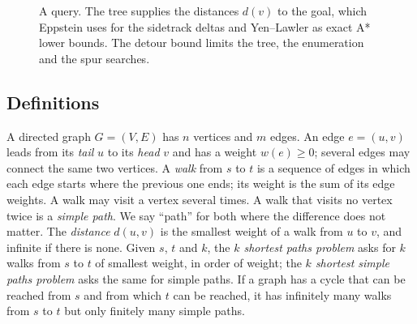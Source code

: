 \documentclass[11pt,a4paper]{article}
\begin{document}
\begin{figure}[t]
\centering
{}
\caption{A query. The tree supplies the distances $d(v)$ to the goal, which Eppstein uses for the sidetrack deltas and
Yen--Lawler as exact A* lower bounds. The detour bound limits the tree, the enumeration and the spur searches.}
\label{fig:pipeline}
\end{figure}

\subsection{Definitions}\label{sec:definitions}
A directed graph $G=(V,E)$ has $n$ vertices and $m$ edges. An edge $e=(u,v)$ leads from its \emph{tail} $u$ to its
\emph{head} $v$ and has a weight $w(e)\ge 0$; several edges may connect the same two vertices. A \emph{walk} from $s$
to $t$ is a sequence of edges in which each edge starts where the previous one ends; its weight is the sum of its
edge weights. A walk may visit a vertex several times. A walk that visits no vertex twice is a \emph{simple path}.
We say ``path'' for both where the difference does not matter. The \emph{distance} $d(u,v)$ is the smallest weight of
a walk from $u$ to $v$, and infinite if there is none. Given $s$, $t$ and $k$, the \emph{$k$ shortest paths problem}
asks for $k$ walks from $s$ to $t$ of smallest weight, in order of weight; the \emph{$k$ shortest simple paths
problem} asks the same for simple paths. If a graph has a cycle that can be reached from $s$ and from which $t$ can
be reached, it has infinitely many walks from $s$ to $t$ but only finitely many simple paths.
\end{document}
